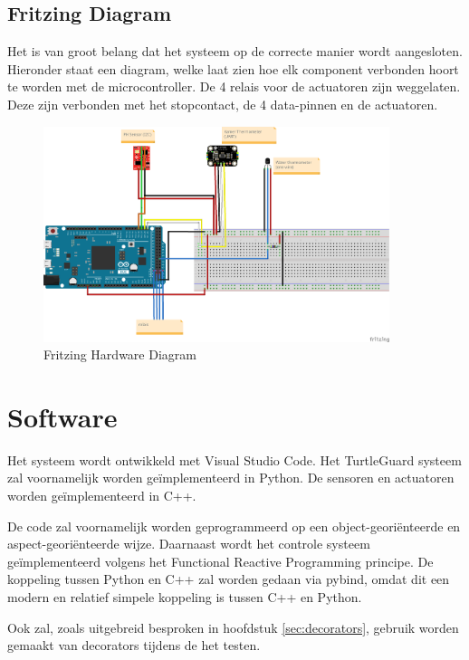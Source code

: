\documentclass[a4paper]{report}
\newcommand{\turtleguard}{\mbox{TurtleGuard\texttrademark}\xspace}
\begin{document}
\subsection{Fritzing Diagram}
Het is van groot belang dat het systeem op de correcte manier wordt aangesloten. Hieronder staat een diagram, welke laat zien hoe elk component verbonden hoort te worden met de microcontroller.
De 4 relais voor de actuatoren zijn weggelaten. Deze zijn verbonden met het stopcontact, de 4 data-pinnen en de actuatoren.
\begin{figure}[h]
  \centering
  \includegraphics[width=0.9\textwidth]{Images/hardware_sketch_fritzing.png}
  \caption{Fritzing Hardware Diagram}
  \label{fig:hardware_sketch_fritzing}
\end{figure}


\section{Software}
Het systeem wordt ontwikkeld met Visual Studio Code. Het \turtleguard systeem zal voornamelijk worden geïmplementeerd in Python. De sensoren en actuatoren worden geïmplementeerd in C++.

De code zal voornamelijk worden geprogrammeerd op een object-georiënteerde en aspect-georiënteerde wijze. 
Daarnaast wordt het controle systeem geïmplementeerd volgens het Functional Reactive Programming principe.
De koppeling tussen Python en C++ zal worden gedaan via pybind, omdat dit een modern en relatief simpele koppeling is tussen C++ en Python.

Ook zal, zoals uitgebreid besproken in hoofdstuk \ref{sec:decorators}, gebruik worden gemaakt van decorators tijdens de het testen.
\end{document}
